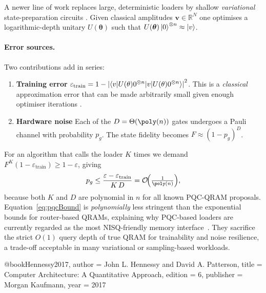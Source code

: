 \documentclass[11pt]{article}
\begin{document}
A newer line of work replaces large, deterministic loaders by shallow
\emph{variational} state-preparation circuits
\cite{Benedetti2019,Du2022}.  
Given classical amplitudes \(\mathbf{v}\in\mathbb{R}^{N}\) one optimises
a logarithmic-depth unitary
\(U(\boldsymbol{\theta})\) such that
\(U(\boldsymbol{\theta})\ket{0}^{\otimes n}\approx\ket{v}\).

\paragraph{Error sources.}
Two contributions add in series:

\begin{enumerate}
\item \textbf{Training error}  
      \(\varepsilon_{\text{train}}
        =1-\abs{\braket{v|U(\theta)0^{\otimes n}}}^{2}\).
      This is a \emph{classical} approximation error that can be made
      arbitrarily small given enough optimiser iterations
      \cite{Du2022}.

\item \textbf{Hardware noise}  
      Each of the \(D=\Theta(\poly(n))\) gates undergoes a Pauli
      channel with probability \(p_{g}\).
      The state fidelity becomes
      \(F\approx (1-p_{g})^{D}\).
\end{enumerate}

For an algorithm that calls the loader \(K\) times we demand  
\(F^{K}(1-\varepsilon_{\text{train}})\ge 1-\varepsilon\), giving
\begin{equation}
   p_{g}
     \le \frac{\varepsilon-\varepsilon_{\text{train}}}{K\,D}
     = \mathcal{O}\!\Bigl(\tfrac{1}{\poly(n)}\Bigr),
   \label{eq:pqcBound}
\end{equation}
because both \(K\) and \(D\) are polynomial in \(n\)
for all known PQC-QRAM proposals.
Equation~\eqref{eq:pqcBound} is \emph{polynomially} less stringent than
the exponential bounds for router-based QRAMs, explaining why
PQC-based loaders are currently regarded as the most NISQ-friendly
memory interface~\cite{Gilyen2023}.
They sacrifice the strict \(O(1)\) query depth of true QRAM for
trainability and noise resilience, a trade-off acceptable in many
variational or sampling-based workloads.

\printbibliography

@book{Hennessy2017,
  author    = {John L. Hennessy and David A. Patterson},
  title     = {Computer Architecture: A Quantitative Approach},
  edition   = {6},
  publisher = {Morgan Kaufmann},
  year      = {2017}
}
\end{document}
